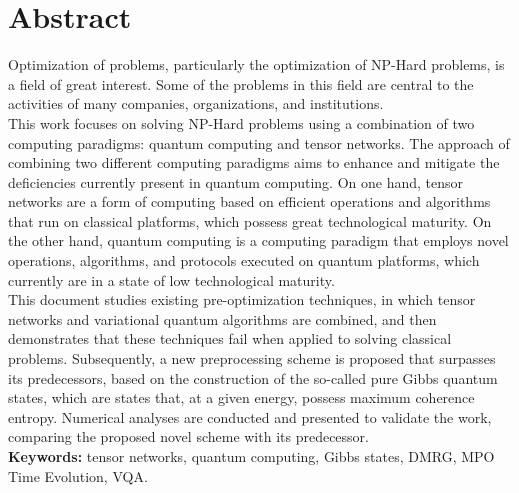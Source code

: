 \chapter{Abstract}

Optimization of problems, particularly the optimization of NP-Hard problems, is a field of great interest. Some of the problems in this field are central to the activities of many companies, organizations, and institutions. \\

This work focuses on solving NP-Hard problems using a combination of two computing paradigms: quantum computing and tensor networks. The approach of combining two different computing paradigms aims to enhance and mitigate the deficiencies currently present in quantum computing. On one hand, tensor networks are a form of computing based on efficient operations and algorithms that run on classical platforms, which possess great technological maturity. On the other hand, quantum computing is a computing paradigm that employs novel operations, algorithms, and protocols executed on quantum platforms, which currently are in a state of low technological maturity. \\

This document studies existing pre-optimization techniques, in which tensor networks and variational quantum algorithms are combined, and then demonstrates that these techniques fail when applied to solving classical problems. Subsequently, a new preprocessing scheme is proposed that surpasses its predecessors, based on the construction of the so-called pure Gibbs quantum states, which are states that, at a given energy, possess maximum coherence entropy. Numerical analyses are conducted and presented to validate the work, comparing the proposed novel scheme with its predecessor. \\



{\bf Keywords:} tensor networks, quantum computing, Gibbs states, DMRG, MPO Time Evolution, VQA.